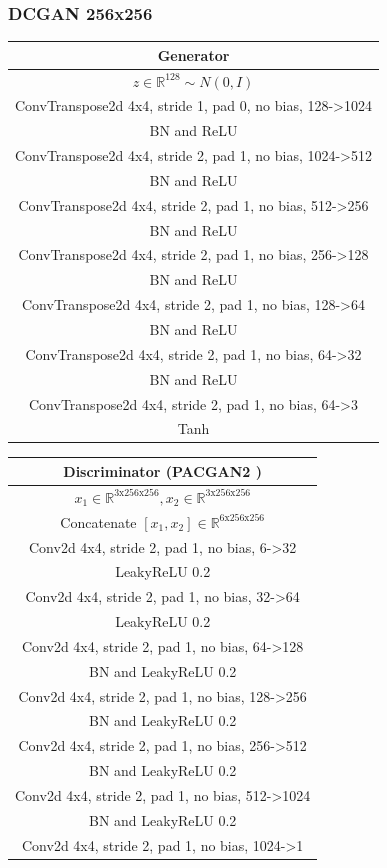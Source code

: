 \documentclass{article}
\begin{document}
\subsubsection{DCGAN 256x256}

\begin{tabular}{c}
	Generator \\
	\toprule\midrule
	$z \in \mathbb{R}^{128} \sim N(0,I)$ \\
	\midrule
	ConvTranspose2d 4x4, stride 1, pad 0, no bias, 128->1024 \\
	\midrule
	BN and ReLU \\
	\midrule
	ConvTranspose2d 4x4, stride 2, pad 1, no bias, 1024->512 \\
	\midrule
	BN and ReLU \\
	\midrule
	ConvTranspose2d 4x4, stride 2, pad 1, no bias, 512->256 \\
	\midrule
	BN and ReLU \\
	\midrule
	ConvTranspose2d 4x4, stride 2, pad 1, no bias, 256->128 \\
	\midrule
	BN and ReLU \\
	\midrule
	ConvTranspose2d 4x4, stride 2, pad 1, no bias, 128->64 \\
	\midrule
	BN and ReLU \\
	\midrule
	ConvTranspose2d 4x4, stride 2, pad 1, no bias, 64->32 \\
	\midrule
	BN and ReLU \\
	\midrule
	ConvTranspose2d 4x4, stride 2, pad 1, no bias, 64->3 \\
	\midrule
	Tanh \\
	\bottomrule
\end{tabular} 
\quad
\begin{tabular}{c}
	Discriminator (PACGAN2 \citep{pacgan}) \\
	\toprule\midrule
	$x_1 \in \mathbb{R}^{\text{3x256x256}}, x_2 \in \mathbb{R}^{\text{3x256x256}}$ \\
	\midrule
	Concatenate $[x_1, x_2] \in \mathbb{R}^{\text{6x256x256}}$ \\
	\midrule
	Conv2d 4x4, stride 2, pad 1, no bias, 6->32 \\
	\midrule
	LeakyReLU 0.2 \\
	\midrule
	Conv2d 4x4, stride 2, pad 1, no bias, 32->64 \\
	\midrule
	LeakyReLU 0.2 \\
	\midrule
	Conv2d 4x4, stride 2, pad 1, no bias, 64->128 \\
	\midrule
	BN and LeakyReLU 0.2 \\
	\midrule
	Conv2d 4x4, stride 2, pad 1, no bias, 128->256 \\
	\midrule
	BN and LeakyReLU 0.2 \\
	\midrule
	Conv2d 4x4, stride 2, pad 1, no bias, 256->512 \\
	\midrule
	BN and LeakyReLU 0.2 \\
	\midrule
	Conv2d 4x4, stride 2, pad 1, no bias, 512->1024 \\
	\midrule
	BN and LeakyReLU 0.2 \\
	\midrule
	Conv2d 4x4, stride 2, pad 1, no bias, 1024->1 \\
	\bottomrule
\end{tabular}
\end{document}
